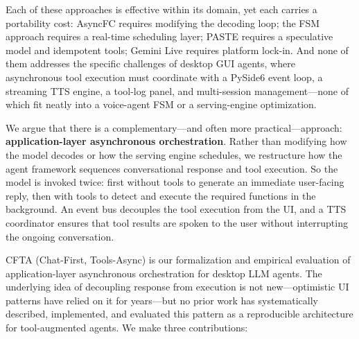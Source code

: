 \documentclass[numbered,mediumone,traditional]{oup-authoring-template}
\begin{document}
Each of these approaches is effective within its domain, yet each carries a portability cost: AsyncFC requires modifying the decoding loop; the FSM approach requires a real-time scheduling layer; PASTE requires a speculative model and idempotent tools; Gemini Live requires platform lock-in. And none of them addresses the specific challenges of desktop GUI agents, where asynchronous tool execution must coordinate with a PySide6 event loop, a streaming TTS engine, a tool-log panel, and multi-session management---none of which fit neatly into a voice-agent FSM or a serving-engine optimization.

We argue that there is a complementary---and often more practical---approach: \textbf{application-layer asynchronous orchestration}. Rather than modifying how the model decodes or how the serving engine schedules, we restructure how the agent framework sequences conversational response and tool execution. So the model is invoked twice: first without tools to generate an immediate user-facing reply, then with tools to detect and execute the required functions in the background. An event bus decouples the tool execution from the UI, and a TTS coordinator ensures that tool results are spoken to the user without interrupting the ongoing conversation.

CFTA (Chat-First, Tools-Async) is our formalization and empirical evaluation of application-layer asynchronous orchestration for desktop LLM agents. The underlying idea of decoupling response from execution is not new---optimistic UI patterns have relied on it for years---but no prior work has systematically described, implemented, and evaluated this pattern as a reproducible architecture for tool-augmented agents. We make three contributions:
\end{document}
